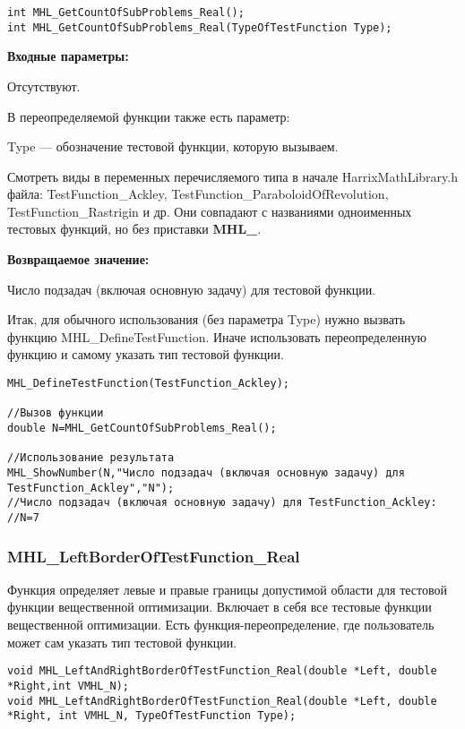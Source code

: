 \documentclass[a4paper,12pt]{article}
\begin{document}
\begin{lstlisting}[label=code_syntax_MHL_GetCountOfSubProblems_Real,caption=Синтаксис]
int MHL_GetCountOfSubProblems_Real();
int MHL_GetCountOfSubProblems_Real(TypeOfTestFunction Type);
\end{lstlisting}

\textbf{Входные параметры:}

Отсутствуют.

В переопределяемой функции также есть параметр:
  
Type --- обозначение тестовой функции, которую вызываем. 

Смотреть виды в переменных перечисляемого типа в начале HarrixMathLibrary.h файла: TestFunction\_Ackley, TestFunction\_ParaboloidOfRevolution, TestFunction\_Rastrigin и др. Они совпадают с названиями одноименных тестовых функций, но без приставки \textbf{MHL\_}.

\textbf{Возвращаемое значение:}
 
Число подзадач (включая основную задачу) для тестовой функции.

Итак, для обычного использования (без параметра Type) нужно вызвать функцию MHL\_DefineTestFunction. Иначе использовать переопределенную функцию и самому указать тип тестовой функции.


\begin{lstlisting}[label=code_use_MHL_GetCountOfSubProblems_Real,caption=Пример использования]
MHL_DefineTestFunction(TestFunction_Ackley);

//Вызов функции
double N=MHL_GetCountOfSubProblems_Real();

//Использование результата
MHL_ShowNumber(N,"Число подзадач (включая основную задачу) для TestFunction_Ackley","N");
//Число подзадач (включая основную задачу) для TestFunction_Ackley:
//N=7
\end{lstlisting}

\subsubsection{MHL\_LeftBorderOfTestFunction\_Real}\label{MHL_LeftBorderOfTestFunction_Real}

Функция определяет левые и правые границы допустимой области для тестовой функции вещественной оптимизации. Включает в себя все тестовые функции вещественной оптимизации. Есть функция-переопределение, где пользователь может сам указать тип тестовой функции.


\begin{lstlisting}[label=code_syntax_MHL_LeftBorderOfTestFunction_Real,caption=Синтаксис]
void MHL_LeftAndRightBorderOfTestFunction_Real(double *Left, double *Right,int VMHL_N);
void MHL_LeftAndRightBorderOfTestFunction_Real(double *Left, double *Right, int VMHL_N, TypeOfTestFunction Type);
\end{lstlisting}
\end{document}

